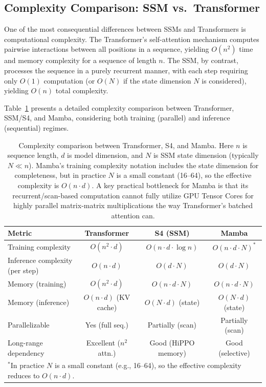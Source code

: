 \documentclass[12pt,a4paper]{article}
\begin{document}
\subsection{Complexity Comparison: SSM vs.\ Transformer}
\label{sec:complexity}

One of the most consequential differences between SSMs and Transformers is computational complexity. The Transformer's self-attention mechanism computes pairwise interactions between all positions in a sequence, yielding $O(n^2)$ time and memory complexity for a sequence of length $n$. The SSM, by contrast, processes the sequence in a purely recurrent manner, with each step requiring only $O(1)$ computation (or $O(N)$ if the state dimension $N$ is considered), yielding $O(n)$ total complexity.

Table~\ref{tab:complexity} presents a detailed complexity comparison between Transformer, SSM/S4, and Mamba, considering both training (parallel) and inference (sequential) regimes.

\begin{table}[htbp]
\centering
\caption{Complexity comparison between Transformer, S4, and Mamba. Here $n$ is sequence length, $d$ is model dimension, and $N$ is SSM state dimension (typically $N \ll n$). Mamba's training complexity notation includes the state dimension for completeness, but in practice $N$ is a small constant (16--64), so the effective complexity is $O(n \cdot d)$. A key practical bottleneck for Mamba is that its recurrent/scan-based computation cannot fully utilize GPU Tensor Cores for highly parallel matrix-matrix multiplications the way Transformer's batched attention can.}
\label{tab:complexity}
\begin{tabular}{lccc}
\toprule
\textbf{Metric} & \textbf{Transformer} & \textbf{S4 (SSM)} & \textbf{Mamba} \\
\midrule
Training complexity & $O(n^2 \cdot d)$ & $O(n \cdot d \cdot \log n)$ & $O(n \cdot d \cdot N)^*$ \\
Inference complexity (per step) & $O(n \cdot d)$ & $O(d \cdot N)$ & $O(d \cdot N)$ \\
Memory (training) & $O(n^2 \cdot d)$ & $O(n \cdot d \cdot N)$ & $O(n \cdot d \cdot N)$ \\
Memory (inference) & $O(n \cdot d)$ (KV cache) & $O(N \cdot d)$ (state) & $O(N \cdot d)$ (state) \\
Parallelizable & Yes (full seq.) & Partially (scan) & Partially (scan) \\
Long-range dependency & Excellent ($n^2$ attn.) & Good (HiPPO memory) & Good (selective) \\
\bottomrule
\multicolumn{4}{l}{\footnotesize $^*$In practice $N$ is a small constant (e.g., 16--64), so the effective complexity reduces to $O(n \cdot d)$.} \\
\end{tabular}
\end{table}
\end{document}
